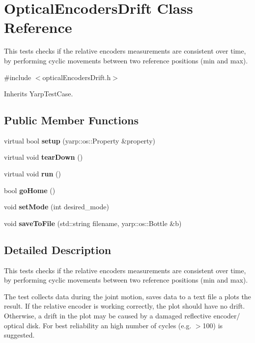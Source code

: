 \section{Optical\+Encoders\+Drift Class Reference}
\label{classOpticalEncodersDrift}


This tests checks if the relative encoders measurements are consistent over time, by performing cyclic movements between two reference positions (min and max).  




{\ttfamily \#include $<$optical\+Encoders\+Drift.\+h$>$}



Inherits Yarp\+Test\+Case.

\subsection*{Public Member Functions}
\begin{DoxyCompactItemize}
\item 
\label{classOpticalEncodersDrift_aaf2fb9fd56a67ad676afb53110a7fadd} 
virtual bool {\bfseries setup} (yarp\+::os\+::\+Property \&property)
\item 
\label{classOpticalEncodersDrift_a54fbea332ba8cc678415595243daed45} 
virtual void {\bfseries tear\+Down} ()
\item 
\label{classOpticalEncodersDrift_a92d1a9549df738b811ac64d1606fb4d8} 
virtual void {\bfseries run} ()
\item 
\label{classOpticalEncodersDrift_aa712ab13068e2b998519674dd806dfc6} 
bool {\bfseries go\+Home} ()
\item 
\label{classOpticalEncodersDrift_a21d00ce0925d82329311b9f60b651c5b} 
void {\bfseries set\+Mode} (int desired\+\_\+mode)
\item 
\label{classOpticalEncodersDrift_abc12a0ac22ad701e4ebb23168c115c5c} 
void {\bfseries save\+To\+File} (std\+::string filename, yarp\+::os\+::\+Bottle \&b)
\end{DoxyCompactItemize}


\subsection{Detailed Description}
This tests checks if the relative encoders measurements are consistent over time, by performing cyclic movements between two reference positions (min and max). 

The test collects data during the joint motion, saves data to a text file a plots the result. If the relative encoder is working correctly, the plot should have no drift. Otherwise, a drift in the plot may be caused by a damaged reflective encoder/ optical disk. For best reliability an high number of cycles (e.\+g. $>$100) is suggested.

